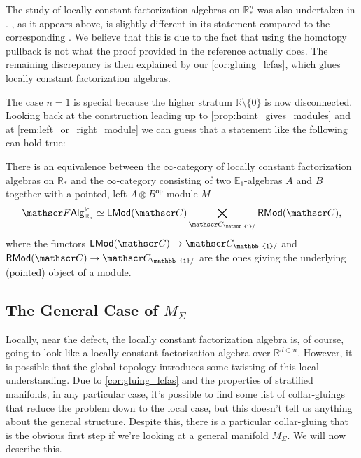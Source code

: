 \documentclass[../text]{subfiles}
\begin{document}
\begin{remark}
    The study of locally constant factorization algebras on $\mathbb{R}^n_*$ was also undertaken in \cite[sec.6.3]{ginot2015}. , as it appears above, is slightly different in its statement compared to the corresponding \cite[cor.8]{ginot2015}. We believe that this is due to the fact that using the homotopy pullback is not what the proof provided in the reference actually does. The remaining discrepancy is then explained by our \cref{cor:gluing_lcfas}, which glues locally constant factorization algebras.
\end{remark}

\begin{remark}
    The case $n=1$ is special because the higher stratum $\mathbb{R} \setminus \{0\}$ is now disconnected. Looking back at the construction leading up to \cref{prop:hoint_gives_modules} and at \cref{rem:left_or_right_module} we can guess that a statement like the following can hold true:
\end{remark}

\begin{proposition}
    There is an equivalence between the $\infty$-category of locally constant factorization algebras on $\mathbb{R}_*$ and the $\infty$-category consisting of two $\mathbb{E}_1$-algebras $A$ and $B$ together with a pointed, left $A \otimes B^\mathsf{op}$-module $M$
    \begin{equation}
        \lcfa_{\mathbb{R}_*} \simeq \mathsf{LMod} (\catC) \bigtimes_{\catC_{\mathbb{1}/}} \mathsf{RMod} (\catC),
    \end{equation}
    where the functors $\mathsf{LMod}(\catC) \rightarrow \catC_{\mathbb{1}/}$ and $\mathsf{RMod}(\catC) \rightarrow \catC_{\mathbb{1}/}$ are the ones giving the underlying (pointed) object of a module.
\end{proposition}



\subsection{The General Case of \texorpdfstring{$M_{\Sigma}$}{M Sigma}}

Locally, near the defect, the locally constant factorization algebra is, of course, going to look like a locally constant factorization algebra over $\mathbb{R}^{d \subset n}$. However, it is possible that the global topology introduces some twisting of this local understanding. Due to \cref{cor:gluing_lcfas} and the properties of stratified manifolds, in any particular case, it's possible to find some list of collar-gluings that reduce the problem down to the local case, but this doesn't tell us anything about the general structure. Despite this, there is a particular collar-gluing that is the obvious first step if we're looking at a general manifold $M_\Sigma$. We will now describe this.
\end{document}
